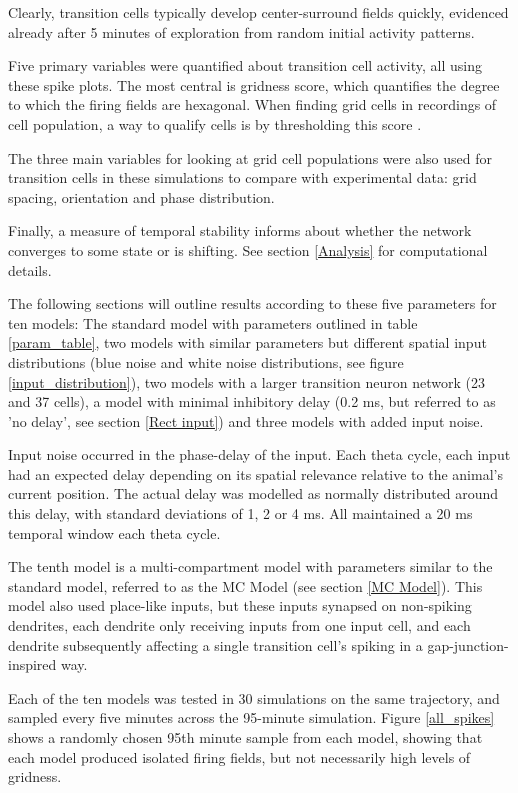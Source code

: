 \documentclass{article}
\begin{document}
    Clearly, transition cells typically develop center-surround fields quickly, evidenced already after 5 minutes of exploration from random initial activity patterns.

    Five primary variables were quantified about transition cell activity, all using these spike plots. The most central is gridness score, which quantifies the degree to which the firing fields are hexagonal. When finding grid cells in recordings of cell population, a way to qualify cells is by thresholding this score \parencite{Sargolini2006}.
    
    The three main variables for looking at grid cell populations were also used for transition cells in these simulations to compare with experimental data: grid spacing, orientation and phase distribution.
    
    Finally, a measure of temporal stability informs about whether the network converges to some state or is shifting. See section \ref{Analysis} for computational details.
    
    The following sections will outline results according to these five parameters for ten models: The standard model with parameters outlined in table \ref{param_table}, two models with similar parameters but different spatial input distributions (blue noise and white noise distributions, see figure \ref{input_distribution}), two models with a larger transition neuron network (23 and 37 cells), a model with minimal inhibitory delay (0.2 ms, but referred to as 'no delay', see section \ref{Rect input}) and three models with added input noise.
    
    Input noise occurred in the phase-delay of the input. Each theta cycle, each input had an expected delay depending on its spatial relevance relative to the animal's current position. The actual delay was modelled as normally distributed around this delay, with standard deviations of 1, 2 or 4 ms. All maintained a 20 ms temporal window each theta cycle.

    The tenth model is a multi-compartment model with parameters similar to the standard model, referred to as the MC Model (see  section \ref{MC Model}). This model also used place-like inputs, but these inputs synapsed on non-spiking dendrites, each dendrite only receiving inputs from one input cell, and each dendrite subsequently affecting a single transition cell's spiking in a gap-junction-inspired way.

    Each of the ten models was tested in 30 simulations on the same trajectory, and sampled every five minutes across the 95-minute simulation. Figure \ref{all_spikes} shows a randomly chosen 95th minute sample from each model, showing that each model produced isolated firing fields, but not necessarily high levels of gridness.
\end{document}
